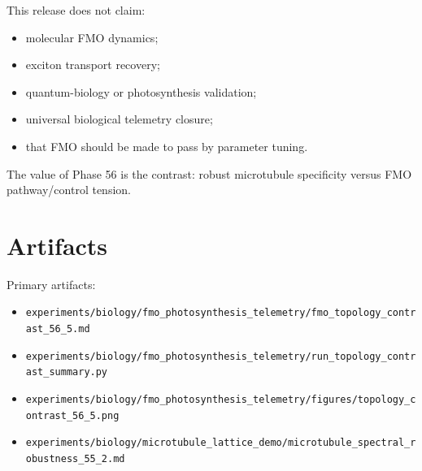 \documentclass[11pt]{article}
\begin{document}
This release does not claim:
\begin{itemize}
\item molecular FMO dynamics;
\item exciton transport recovery;
\item quantum-biology or photosynthesis validation;
\item universal biological telemetry closure;
\item that FMO should be made to pass by parameter tuning.
\end{itemize}

The value of Phase 56 is the contrast: robust microtubule specificity versus FMO pathway/control tension.

\section{Artifacts}

Primary artifacts:
\begin{itemize}
\item \texttt{experiments/biology/fmo\_photosynthesis\_telemetry/fmo\_topology\_contrast\_56\_5.md}
\item \texttt{experiments/biology/fmo\_photosynthesis\_telemetry/run\_topology\_contrast\_summary.py}
\item \texttt{experiments/biology/fmo\_photosynthesis\_telemetry/figures/topology\_contrast\_56\_5.png}
\item \texttt{experiments/biology/microtubule\_lattice\_demo/microtubule\_spectral\_robustness\_55\_2.md}
\end{itemize}
\end{document}
